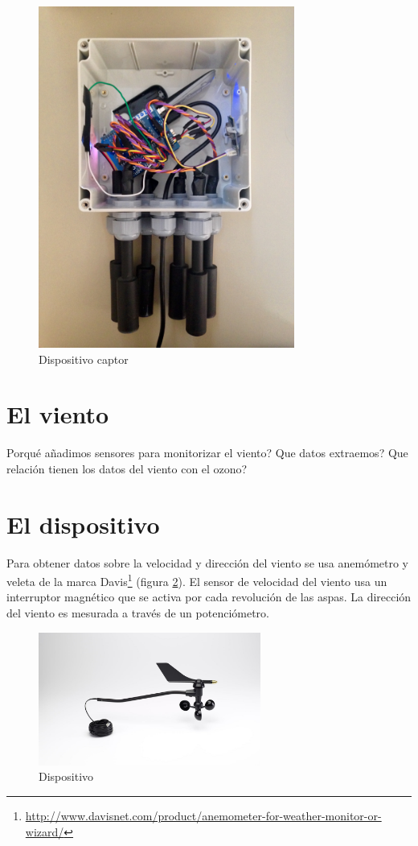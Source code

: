 \documentclass[a4paper, 11pt]{article}
\begin{document}
\begin{figure}[h]
\begin{minipage}{0.5\textwidth}
	\includegraphics[width=0.75\textwidth]{img/Captor2.jpg}
	\end{minipage}
\caption{Dispositivo captor}
\label{fig:captor}
\end{figure}
\newpage

\section{El viento}
Porqué añadimos sensores para monitorizar el viento?
Que datos extraemos?
Que relación tienen los datos del viento con el ozono?
\newpage

\section{El dispositivo}
Para obtener datos sobre la velocidad y dirección del viento se usa anemómetro y veleta de la marca Davis\footnote{\url{http://www.davisnet.com/product/anemometer-for-weather-monitor-or-wizard/}} (figura \ref{fig:gadget}). El sensor de velocidad del viento usa un interruptor magnético que se activa por cada revolución de las aspas. La dirección del viento es mesurada a través de un potenciómetro.

\begin{figure}[h]
	\center
	\includegraphics[width=0.65\textwidth]{img/davis.jpg}
	\caption{Dispositivo}
	\label{fig:gadget}
\end{figure}
\end{document}
